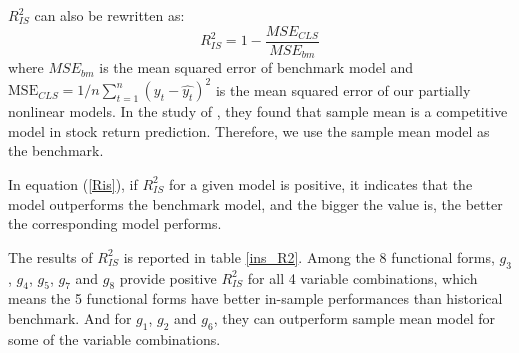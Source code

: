 \documentclass[a4paper,12pt,times,numbered,print,index]{report}
\numberwithin{equation}{section}
\begin{document}
	
	$R^2_{IS}$ can also be rewritten as:
	\begin{equation}
		R_{IS}^{2}=1-\frac{MSE_{CLS}}{MSE_{bm}}
		\label{Ris}
	\end{equation}
	where $MSE_{bm}$ is the mean squared error of benchmark model and $\mathrm{MSE}_{CLS}=1 / n \sum_{t=1}^{n}\left(y_{t}-\hat{y_t}\right)^{2}$ is the mean squared error of our partially nonlinear models. 
	In the study of \cite{welch2008comprehensive}, they found that sample mean is a competitive model in stock return prediction. Therefore, we use the sample mean model as the benchmark. 
	
	In equation (\ref{Ris}), if $R^2_{IS}$ for a given model is positive, it indicates that the model outperforms the benchmark model, and the bigger the value is, the better the corresponding model performs.
	
	The results of $R^2_{IS}$ is reported in table \ref{ins_R2}. Among the 8 functional forms, $g_3$, $g_4$, $g_5$, $g_7$ and $g_8$ provide positive $R^2_{IS}$ for all 4 variable combinations, which means the 5 functional forms have better in-sample performances than historical benchmark. And for $g_1$, $g_2$ and $g_6$, they can outperform sample mean model for some of the variable combinations. 
	
	
	
\end{document}

